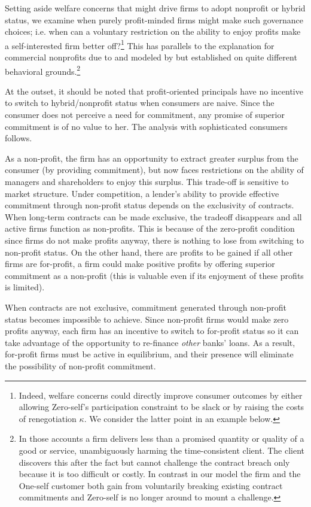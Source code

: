 \documentclass[11pt,english]{article}
\theoremstyle{plain}
\theoremstyle{definition}
\begin{document}
Setting aside welfare concerns that might drive firms to adopt nonprofit
or hybrid status, we examine when purely profit-minded firms might
make such governance choices; i.e. when can a voluntary restriction
on the ability to enjoy profits make a self-interested firm better
off?\footnote{Indeed, welfare concerns could directly improve consumer outcomes
by either allowing Zero-self's participation constraint to be slack
or by raising the costs of renegotiation $\kappa$. We consider the
latter point in an example below.} This has parallels to the explanation for commercial nonprofits due
to \citet{hansmann1996a} and modeled by \citet{glaeser2001} but
established on quite different behavioral grounds.\footnote{In those accounts a firm delivers less than a promised quantity or
quality of a good or service, unambiguously harming the time-consistent
client. The client discovers this after the fact but cannot challenge
the contract breach only because it is too difficult or costly. In
contrast in our model the firm and the One-self customer both gain
from voluntarily breaking existing contract commitments and Zero-self
is no longer around to mount a challenge.}

At the outset, it should be noted that profit-oriented principals
have no incentive to switch to hybrid/nonprofit status when consumers
are naive. Since the consumer does not perceive a need for commitment,
any promise of superior commitment is of no value to her. The analysis
with sophisticated consumers follows.

As a non-profit, the firm has an opportunity to extract greater surplus
from the consumer (by providing commitment), but now faces restrictions
on the ability of managers and shareholders to enjoy this surplus.
This trade-off is sensitive to market structure. Under competition,
a lender's ability to provide effective commitment through non-profit
status depends on the exclusivity of contracts. When long-term contracts
can be made exclusive, the tradeoff disappears and all active firms
function as non-profits. This is because of the zero-profit condition
\textendash{} since firms do not make profits anyway, there is nothing
to lose from switching to non-profit status. On the other hand, there
are profits to be gained \textendash{} if all other firms are for-profit,
a firm could make positive profits by offering superior commitment
as a non-profit (this is valuable even if its enjoyment of these profits
is limited).

When contracts are not exclusive, commitment generated through non-profit
status becomes impossible to achieve. Since non-profit firms would
make zero profits anyway, each firm has an incentive to switch to
for-profit status so it can take advantage of the opportunity to re-finance
\textit{other} banks' loans. As a result, for-profit firms must be
active in equilibrium, and their presence will eliminate the possibility
of non-profit commitment.
\end{document}
